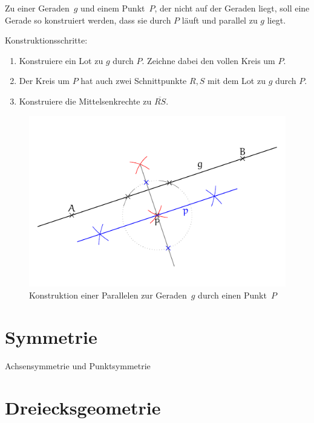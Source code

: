 \begin{regel}

Zu einer Geraden~\(g\) und einem Punkt~\(P\), der nicht auf der Geraden liegt, soll eine Gerade so konstruiert werden, dass sie durch \(P\) läuft und parallel zu \(g\) liegt.

Konstruktionsschritte:
\begin{enumerate}
 \item Konstruiere ein Lot zu \(g\) durch \(P\). Zeichne dabei den vollen Kreis um \(P\).
 \item Der Kreis um \(P\) hat auch zwei Schnittpunkte \(R,S\) mit dem Lot zu \(g\) durch \(P\).
 \item Konstruiere die Mittelsenkrechte zu \(\overline{RS}\).
\end{enumerate}

 \begin{figure}[t]
 \centering
 \includegraphics[width=\textwidth]{./parallele_konstr.pdf}
 \caption{Konstruktion einer Parallelen zur Geraden~$g$ durch einen Punkt~$P$}
 \label{fig:parallele_konstruktion}
\end{figure}

\end{regel}

\section{Symmetrie}

Achsensymmetrie und Punktsymmetrie


\section{Dreiecksgeometrie}

